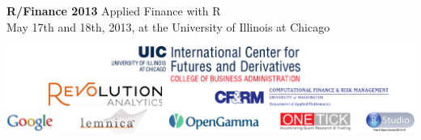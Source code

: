 {\Huge \textbf{\color{KeynoteTalk} R/Finance 2013} \huge \phantom{i} Applied Finance with R} \\
{\large \color{Breaks} May 17th and 18th, 2013, at the University of Illinois at Chicago} \\
\vspace{3ex}
\hrulefill
\vspace{-2ex}
\begin{center}
\includegraphics[scale=0.8]{sponsors.pdf}
\end{center}
\vspace{-3ex}
\hrulefill

